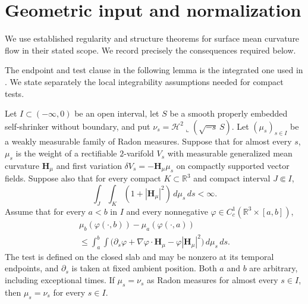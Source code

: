 \section{Geometric input and normalization}\label{sec:geometry}
We use established regularity and structure theorems for surface mean curvature flow in their stated scope. We record precisely the consequences required below.

The endpoint and test clause in the following lemma is the integrated
one used in \cite[Section~2.1]{BK2024}.  We state separately the local
integrability assumptions needed for compact tests.

\begin{lemma}
\label{geo:representative}
Let $I\subset(-\infty,0)$ be an open interval, let $S$ be a smooth
properly embedded self-shrinker without boundary, and put
$\nu_s=\mathcal H^2\!\llcorner(\sqrt{-s}\,S)$.  Let $(\mu_s)_{s\in I}$
be a weakly measurable family of Radon measures.  Suppose that for
almost every $s$, $\mu_s$ is the weight of a rectifiable $2$-varifold
$V_s$ with measurable generalized mean curvature $\mathbf H_\mu$ and
first variation $\delta V_s=-\mathbf H_\mu\mu_s$ on compactly
supported vector fields.  Suppose also that for every compact
$K\subset\mathbb R^3$ and compact interval $J\Subset I$,
\begin{equation}\label{geo:representative-integrability}
 \int_J\!\int_K(1+|\mathbf H_\mu|^2)\,d\mu_s\,ds<\infty.
\end{equation}
Assume that for every $a<b$ in $I$ and every nonnegative
$\varphi\in C_c^1(\mathbb R^3\times[a,b])$,
\begin{multline}\label{geo:all-endpoint-brakke}
 \mu_b(\varphi(\cdot,b))-\mu_a(\varphi(\cdot,a))
 \\
 \le\int_a^b\!\int\bigl(\partial_s\varphi
       +\nabla\varphi\cdot\mathbf H_\mu
       -\varphi|\mathbf H_\mu|^2\bigr)\,d\mu_s\,ds.
\end{multline}
The test is defined on the closed slab and may be nonzero at its
temporal endpoints, and $\partial_s$ is taken at fixed ambient
position.  Both $a$ and $b$ are arbitrary, including exceptional
times.  If $\mu_s=\nu_s$ as Radon measures for almost every $s\in I$,
then $\mu_s=\nu_s$ for every $s\in I$.
\end{lemma}

